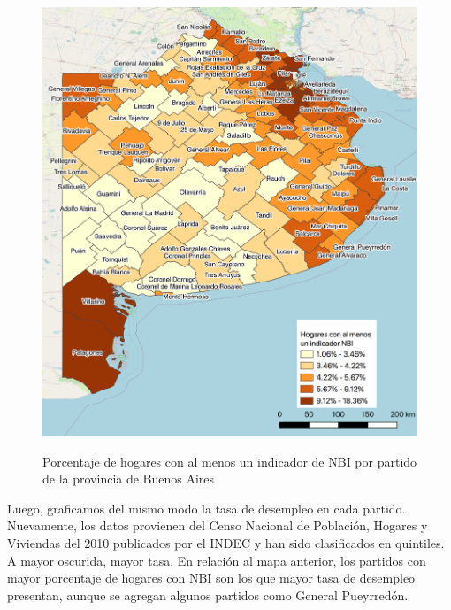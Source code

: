 \documentclass[9pt]{article}
\begin{document}
\begin{figure}[H]
    \centering
    \caption{Porcentaje de hogares con al menos un indicador de NBI por partido de la provincia de Buenos Aires}
    \includegraphics[width=\textwidth]{BSAS_NBI.png}
    \label{fig:NBI}
\end{figure}
\newpage
Luego, graficamos del mismo modo la tasa de desempleo en cada partido. Nuevamente, los datos provienen del Censo Nacional de Población, Hogares y Viviendas del 2010 publicados por el INDEC y han sido clasificados en quintiles. A mayor oscurida, mayor tasa. En relación al mapa anterior, los partidos con mayor porcentaje de hogares con NBI son los que mayor tasa de desempleo presentan, aunque se agregan algunos partidos como General Pueyrred\'on.
\end{document}
